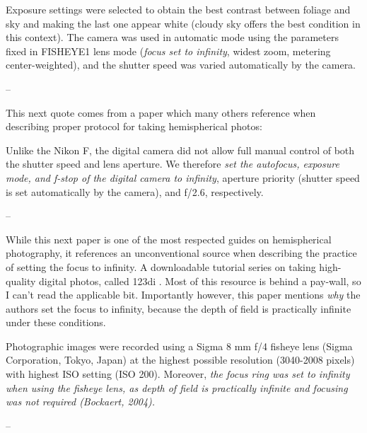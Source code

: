 \documentclass[11pt,a4paper]{article}
\begin{document}
\begin{minipage}{\linewidth}
\begin{framed}
Exposure settings were selected to obtain the best contrast between foliage and sky and making the last one appear white (cloudy sky offers the best condition in this context). The camera was used in automatic mode using the parameters fixed in FISHEYE1 lens mode (\textit{focus set to infinity}, widest zoom, metering center-weighted), and the shutter speed was varied automatically by the camera.

-- \citealt{Paletto2009}
\end{framed}
\end{minipage}

This next quote comes from a paper which many others reference when describing proper protocol for taking hemispherical photos: 

\begin{minipage}{\linewidth}
\begin{framed}
Unlike the Nikon F, the digital camera did not allow full manual control of both the shutter speed and lens aperture. We therefore \textit{set the autofocus, exposure mode, and f-stop of the digital camera to infinity}, aperture priority (shutter speed is set automatically by the camera), and f/2.6, respectively. 

-- \citealt{Frazer2001}
\end{framed}
\end{minipage}

While this next paper is one of the most respected guides on hemispherical photography, it references an unconventional source when describing the practice of setting the focus to infinity. A downloadable tutorial series on taking high-quality digital photos, called 123di \citep{123di}. Most of this resource is behind a pay-wall, so I can't read the applicable bit. Importantly however, this paper mentions \textit{why} the authors set the focus to infinity, because the depth of field is practically infinite under these conditions.

\begin{minipage}{\linewidth}
\begin{framed}
Photographic images were recorded using a Sigma 8 mm f/4 fisheye lens (Sigma Corporation, Tokyo, Japan) at the highest possible resolution (3040-2008 pixels) with highest ISO setting (ISO 200). Moreover, \textit{the focus ring was set to infinity when using the fisheye lens, as depth of field is practically infinite and focusing was not required (Bockaert, 2004).}

-- \citealt{Jonckheere2005}
\end{framed}
\end{minipage}
\end{document}
